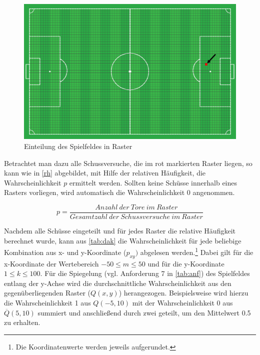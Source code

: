 \begin{figure}[H]
\centering
\includegraphics[scale=0.28]{se-wa-jpg/raster}
\caption[Einteilung des Spielfeldes in Raster]{Einteilung des Spielfeldes in Raster}
\label{raster}
\end{figure}

Betrachtet man dazu alle Schussversuche, die im rot markierten Raster liegen, so kann wie in \vref{rh} abgebildet, mit Hilfe der relativen Häufigkeit, die Wahrscheinlichkeit $p$ ermittelt werden. Sollten keine Schüsse innerhalb eines Rasters vorliegen, wird automatisch die Wahrscheinlichkeit 0 angenommen.

\begin{equation}
p = \frac{Anzahl~der~Tore~im~Raster}{Gesamtzahl~der~Schussversuche~im~Raster}
\label{rh}
\end{equation}

Nachdem alle Schüsse eingeteilt und für jedes Raster die relative Häufigkeit berechnet wurde, kann aus \vref{tab:dak} die Wahrscheinlichkeit für jede beliebige Kombination aus x- und y-Koordinate ($p_{xy})$ abgelesen werden.\footnote{Die Koordinatenwerte werden jeweils aufgerundet.} Dabei gilt für die x-Koordinate der Wertebereich $-50 \le m \le 50$ und für die y-Koordinate $1 \le k \le 100$. Für die Spiegelung (vgl. Anforderung 7 in \vref{tab:anf}) des Spielfeldes entlang der y-Achse wird die durchschnittliche Wahrscheinlichkeit aus den gegenüberliegenden Raster ($Q(x,y)$) herangezogen. Beispielsweise wird hierzu die Wahrscheinlichkeit \textsf{1} aus $Q(-5,10)$ mit der Wahrscheinlichkeit \textsf{0} aus $\overline{Q}(5,10)$ summiert und anschließend durch zwei geteilt, um den Mittelwert \textsf{0.5} zu erhalten. 



